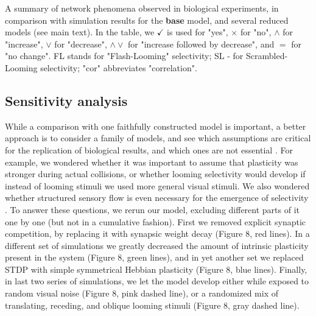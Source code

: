 \documentclass{article}
\begin{document}
\begin{table}
    
    \caption{A summary of network phenomena observed in biological experiments, in comparison with simulation results for the \textbf{base} model, and several reduced models (see main text). In the table, we $\checkmark$ is used for "yes", $\times$ for "no", $\land$ for "increase", $\lor$ for "decrease", $\land \lor$ for "increase followed by decrease", and $=$ for "no change". FL stands for "Flash-Looming" selectivity; SL - for Scrambled-Looming selectivity; "cor" abbreviates "correlation".}
\end{table}

\subsection*{Sensitivity analysis}

While a comparison with one faithfully constructed model is important, a better approach is to consider a family of models, and see which assumptions are critical for the replication of biological results, and which ones are not essential \citep{linderman2017constrain, pauli2018repro}. For example, we wondered whether it was important to assume that plasticity was stronger during actual collisions, or whether looming selectivity would develop if instead of looming stimuli we used more general visual stimuli. We also wondered whether structured sensory flow is even necessary for the emergence of selectivity \citep{triplett2018emergence}. To answer these questions, we rerun our model, excluding different parts of it one by one (but not in a cumulative fashion). First we removed explicit synaptic competition, by replacing it with synapsic weight decay (Figure 8, red lines). In a different set of simulations we greatly decreased the amount of intrinsic plasticity present in the system (Figure 8, green lines), and in yet another set we replaced STDP with simple symmetrical Hebbian plasticity (Figure 8, blue lines). Finally, in last two series of simulations, we let the model develop either while exposed to random visual noise (Figure 8, pink dashed line), or a randomized mix of translating, receding, and oblique looming stimuli (Figure 8, gray dashed line).
\end{document}

